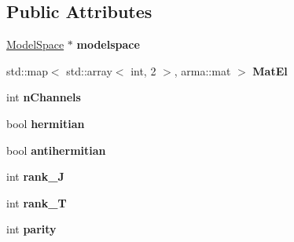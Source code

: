\subsection*{Public Attributes}
\begin{DoxyCompactItemize}
\item 
\mbox{\label{classTwoBodyME_af80319b759d9f0a1409e429def4dfbd7}} 
\hyperlink{classModelSpace}{Model\+Space} $\ast$ {\bfseries modelspace}
\item 
\mbox{\label{classTwoBodyME_a3d9a200451347886bd72b94e47b30750}} 
std\+::map$<$ std\+::array$<$ int, 2 $>$, arma\+::mat $>$ {\bfseries Mat\+El}
\item 
\mbox{\label{classTwoBodyME_aa389c365fc444a554a4e253df10f14c9}} 
int {\bfseries n\+Channels}
\item 
\mbox{\label{classTwoBodyME_ad29c6a4d543d73f008503312ac4184bf}} 
bool {\bfseries hermitian}
\item 
\mbox{\label{classTwoBodyME_a1483d9997eee9c3b9aff840488ebb09a}} 
bool {\bfseries antihermitian}
\item 
\mbox{\label{classTwoBodyME_a2582cd10bbc17baf24dae2d8a25e78da}} 
int {\bfseries rank\+\_\+J}
\item 
\mbox{\label{classTwoBodyME_a1f82dd6078226acd0afbe3b510b7098a}} 
int {\bfseries rank\+\_\+T}
\item 
\mbox{\label{classTwoBodyME_af4dc0e00484359f1f880e07ecc599cae}} 
int {\bfseries parity}
\end{DoxyCompactItemize}


